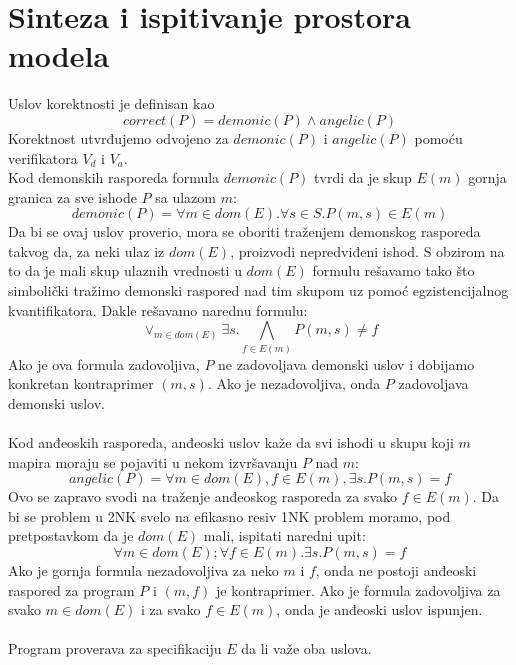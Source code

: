 \documentclass[a4paper]{article}
\begin{document}
\section{Sinteza i ispitivanje prostora modela}
Uslov korektnosti je definisan kao 
\begin{equation}
correct(P) = demonic(P) \land angelic(P)
\end{equation}
Korektnost utvrđujemo odvojeno za $demonic(P)$ i $angelic(P)$ pomoću verifikatora $V_d$ i $V_a$.\\
Kod demonskih rasporeda formula $demonic(P)$ tvrdi da je skup $E(m)$ gornja granica za sve ishode $P$ sa ulazom $m$:
\begin{equation}
demonic(P) = \forall m \in dom(E). \forall s \in S. P(m,s) \in E(m)
\end{equation}
Da bi se ovaj uslov proverio, mora se oboriti traženjem demonskog rasporeda takvog da, za neki ulaz iz $dom(E)$, proizvodi nepredviđeni ishod. S obzirom na to da je mali skup ulaznih vrednosti u $dom(E)$ formulu rešavamo tako što simbolički tražimo demonski raspored nad tim skupom uz pomoć egzistencijalnog kvantifikatora. Dakle rešavamo narednu formulu:
\begin{equation}
\vee_{m \in dom(E)} \exists s. \bigwedge_{f \in E(m)} P(m,s) \neq f
\end{equation}
Ako je ova formula zadovoljiva, $P$ ne zadovoljava demonski uslov i dobijamo konkretan kontraprimer $(m,s)$. Ako je nezadovoljiva, onda $P$ zadovoljava demonski uslov.\\\\
Kod anđeoskih rasporeda, anđeoski uslov kaže da svi ishodi u skupu koji $m$
mapira moraju se pojaviti u nekom izvršavanju $P$ nad $m$:
\begin{equation}
angelic(P) = \forall m \in dom(E), f \in E(m), \exists s.P(m,s) = f
\end{equation}
Ovo se zapravo svodi na traženje anđeoskog rasporeda za svako $f \in E(m)$. Da bi se problem u 2NK svelo na efikasno resiv 1NK problem moramo, pod pretpostavkom da je $dom(E)$ mali, ispitati naredni upit:
\begin{equation}
\forall m \in dom(E); \forall f \in E(m). \exists s.P(m,s) = f
\end{equation}
Ako je gornja formula nezadovoljiva za neko $m$ i $f$, onda ne postoji anđeoski raspored za program $P$ i $(m,f)$ je kontraprimer. Ako je formula zadovoljiva za svako $m \in dom(E)$ i za svako $f \in E(m)$, onda je anđeoski uslov ispunjen.\\\\
Program proverava za specifikaciju $E$ da li važe oba uslova.
\end{document}
